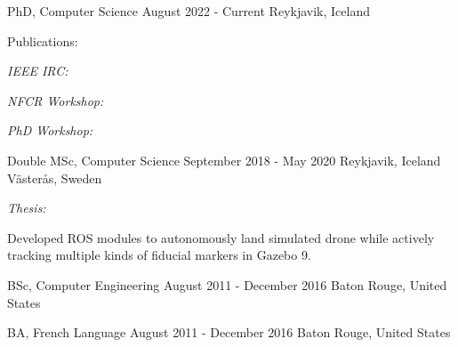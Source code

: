 

\begin{cventries}

  \cventry
    {PhD, Computer Science}
    {August 2022 - Current}
    {\hir}
    {Reykjavik, Iceland}
    {
    \vspace{-3mm}
    \begin{flushleft}
    Publications:
    \end{flushleft}
      \vspace{2mm}
      \begin{cvitems}
        \item {\emph{IEEE IRC:} }
        \item {\emph{NFCR Workshop:} }
        \item {\emph{PhD Workshop:} }
      \end{cvitems}
    }

  \doubleheadercventry
    {Double MSc, Computer Science} %
    {September 2018 - May 2020} %
    {\hir} %
    {Reykjavik, Iceland} %
    {\mdh}
    {Västerås, Sweden}
    {
      \begin{cvitems} %
        \item {\emph{Thesis:} } 
	\item Developed ROS modules to autonomously land simulated drone while actively tracking multiple kinds of fiducial markers in Gazebo 9.
      \end{cvitems}
    }
    
  \cventrywithoutdescription
    {BSc, Computer Engineering}
    {August 2011 - December 2016}
    {\lsu}
    {Baton Rouge, United States}

  \cventrywithoutdescription
    {BA, French Language}
    {August 2011 - December 2016}
    {\lsu}
    {Baton Rouge, United States}
\end{cventries}
